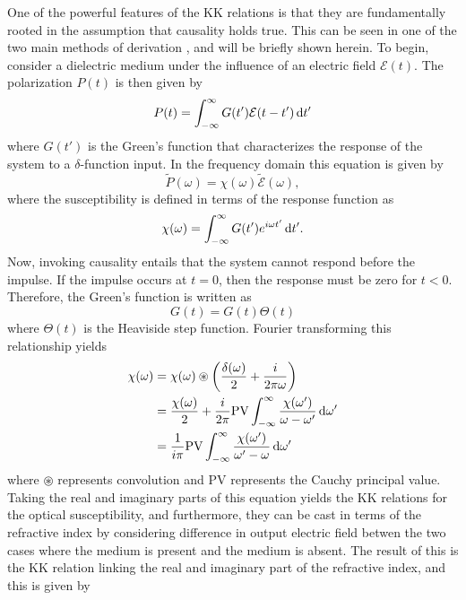 One of the powerful features of the KK relations is that they are fundamentally rooted in the assumption that causality holds true.  This can be seen in one of the two main methods of derivation \cite{hutchingsKramersKronigRelationsNonlinear1992, jacksonClassicalElectrodynamics1999, arfkenMathematicalMethodsPhysicists2013}, and will be briefly shown herein.   To begin, consider a dielectric medium under the influence of an electric field $\mathcal{E}(t)$.  The polarization $P(t)$ is then given by
\begin{equation}
	P(t)=\int_{-\infty}^{\infty}G(t')\mathcal{E}(t-t') \mathop{}\!\mathrm{d} t'
\end{equation} 
where $G(t')$ is the Green's function that characterizes the response of the system to a $\delta$-function input.  In the frequency domain this equation is given by
\begin{equation}
	\tilde{P}(\omega)=\chi(\omega)\tilde{\mathcal{E}}(\omega),
\end{equation}
where the susceptibility is defined in terms of the response function as
\begin{equation}
	\chi(\omega)=\int_{-\infty}^{\infty}G(t')e^{i\omega t'}\mathop{}\!\mathrm{d} t'.
\end{equation}
Now, invoking causality entails that the system cannot respond before the impulse.  If the impulse occurs at $t=0$, then the response must be zero for $t<0$.  Therefore, the Green's function is written as
\begin{equation}
	G(t)=G(t)\Theta(t)
\end{equation}
where $\Theta(t)$ is the Heaviside step function.  Fourier transforming this relationship yields
\begin{equation}
	\label{eqn:KK_chi}
	\begin{aligned}
		\chi(\omega) &= \chi(\omega) \circledast \bigg(\frac{\delta(\omega)}{2} + \frac{i}{2\pi\omega}\bigg)\\
		& = \frac{\chi(\omega)}{2} + \frac{i}{2\pi} \mathrm{PV} \int_{-\infty}^{\infty}\frac{\chi(\omega')}{\omega - \omega'}\mathop{}\!\mathrm{d}\omega'\\
		& = \frac{1}{i\pi} \mathrm{PV} \int_{-\infty}^{\infty}\frac{\chi(\omega')}{\omega' - \omega} \mathop{}\!\mathrm{d} \omega'
	\end{aligned}
\end{equation}
where $\circledast$ represents convolution and  $\mathrm{PV}$ represents the Cauchy principal value.  Taking the real and imaginary parts of this equation yields the KK relations for the optical susceptibility, and furthermore, they can be cast in terms of the refractive index by considering difference in output electric field betwen the two cases where the medium is present and the medium is absent.  The result of this is the KK relation linking the real and imaginary part of the refractive index, and this is given by
